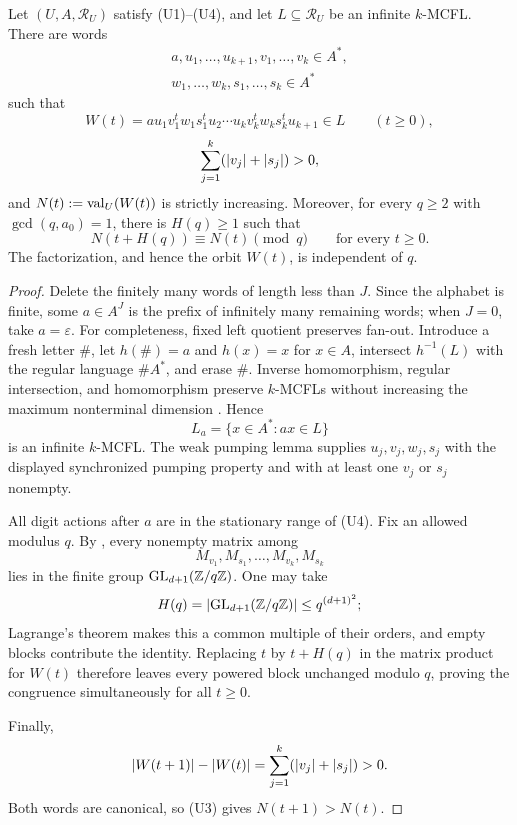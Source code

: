 \begin{theorem}
  \label{thm:mcfl-synchronized-congruence-orbit}
  Let \((U,A,\mathcal R_U)\) satisfy \textup{(U1)--(U4)}, and let
  \(L\subseteq\mathcal R_U\) be an infinite \(k\)-MCFL. There are words
  \[
    \begin{gathered}
      a,u_1,\ldots,u_{k+1},v_1,\ldots,v_k\in A^\ast,\\
      w_1,\ldots,w_k,s_1,\ldots,s_k\in A^\ast
    \end{gathered}
  \]
  such that
  \[
    W(t)=a u_1v_1^tw_1s_1^tu_2\cdots
          u_kv_k^tw_ks_k^tu_{k+1}\in L
          \qquad(t\ge0),
  \]
  \[
    \sum_{j=1}^k(\lvert v_j \rvert+\lvert s_j \rvert)>0,
  \]
  and \(N(t):=\operatorname{val}_U(W(t))\) is strictly increasing. Moreover, for
  every \(q\ge2\) with \(\gcd(q,a_0)=1\), there is \(H(q)\ge1\) such
  that
  \[
    N(t+H(q))\equiv N(t)\pmod q
    \qquad\text{for every }t\ge0.
  \]
  The factorization, and hence the orbit \(W(t)\), is independent of
  \(q\).
\end{theorem}

\begin{proof}
  Delete the finitely many words of length less than \(J\). Since the
  alphabet is finite, some \(a\in A^J\) is the prefix of infinitely many
  remaining words; when \(J=0\), take \(a=\varepsilon\). For completeness,
  fixed left quotient preserves fan-out. Introduce a fresh letter \(\#\),
  let \(h(\#)=a\) and \(h(x)=x\) for \(x\in A\), intersect
  \(h^{-1}(L)\) with the regular language \(\#A^*\), and erase \(\#\).
  Inverse homomorphism, regular intersection, and homomorphism preserve
  \(k\)-MCFLs without increasing the maximum nonterminal dimension
  \cite[Proposition~2.3]{DuncanElderFrenkelLiu2026}. Hence
  \[
    L_a=\{x\in A^\ast:ax\in L\}
  \]
  is an infinite \(k\)-MCFL. The weak pumping lemma supplies
  \(u_j,v_j,w_j,s_j\) with the displayed synchronized pumping property
  and with at least one \(v_j\) or \(s_j\) nonempty.

  All digit actions after \(a\) are in the stationary range of
  \textup{(U4)}. Fix an allowed modulus \(q\). By
  , every nonempty matrix among
  \[
    M_{v_1},M_{s_1},\ldots,M_{v_k},M_{s_k}
  \]
  lies in the finite group
  \(\operatorname{GL}_{d+1}(\mathbb{Z}/q\mathbb{Z})\). One may take
  \[
    H(q)=\lvert \operatorname{GL}_{d+1}(\mathbb{Z}/q\mathbb{Z}) \rvert
      \le q^{(d+1)^2};
  \]
  Lagrange's theorem makes this a common multiple of their orders, and
  empty blocks contribute the identity.
  Replacing \(t\) by \(t+H(q)\) in the matrix product for \(W(t)\)
  therefore leaves every powered block unchanged modulo \(q\), proving
  the congruence simultaneously for all \(t\ge0\).

  Finally,
  \[
    \lvert W(t+1) \rvert-\lvert W(t) \rvert
      =\sum_{j=1}^k(\lvert v_j \rvert+\lvert s_j \rvert)>0.
  \]
  Both words are canonical, so \textup{(U3)} gives
  \(N(t+1)>N(t)\).
\end{proof}

